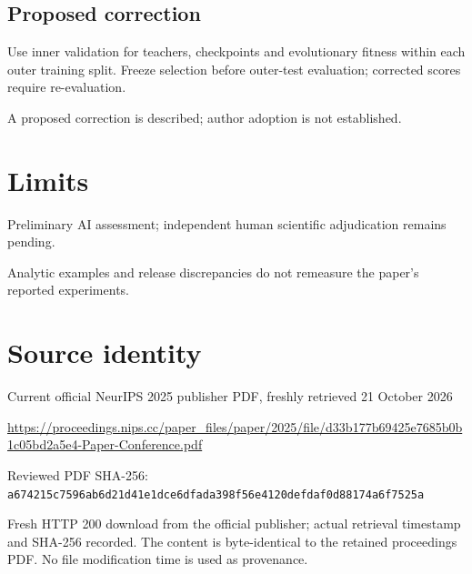 \documentclass[11pt]{article}
\begin{document}
\subsection*{Proposed correction}

Use inner validation for teachers, checkpoints and evolutionary fitness within each outer training split. Freeze selection before outer-test evaluation; corrected scores require re-evaluation.

A proposed correction is described; author adoption is not established.

\section*{Limits}

Preliminary AI assessment; independent human scientific adjudication remains pending.\par

Analytic examples and release discrepancies do not remeasure the paper’s reported experiments.\par

\section*{Source identity}

Current official NeurIPS 2025 publisher PDF, freshly retrieved 21 October 2026

\url{https://proceedings.nips.cc/paper_files/paper/2025/file/d33b177b69425e7685b0b1c05bd2a5e4-Paper-Conference.pdf}

Reviewed PDF SHA-256: \nolinkurl{a674215c7596ab6d21d41e1dce6dfada398f56e4120defdaf0d88174a6f7525a}

Fresh HTTP 200 download from the official publisher; actual retrieval timestamp and SHA-256 recorded. The content is byte-identical to the retained proceedings PDF. No file modification time is used as provenance.
\end{document}
